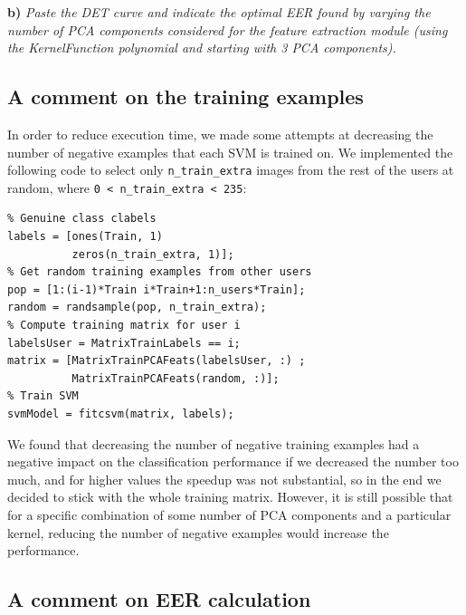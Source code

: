 \documentclass[11pt]{article}
\begin{document}
\textbf{b)} \textit{Paste the DET curve and indicate the optimal EER found by varying the number of PCA components considered for the feature extraction module (using the KernelFunction polynomial and starting with 3 PCA components).}


\subsection*{A comment on the training examples}

In order to reduce execution time, we made some attempts at decreasing the number of negative examples that each SVM is trained on. We implemented the following code to select only \verb|n_train_extra| images from the rest of the users at random, where \verb|0 < n_train_extra < 235|:
\begin{verbatim}
% Genuine class clabels
labels = [ones(Train, 1)
          zeros(n_train_extra, 1)];
% Get random training examples from other users
pop = [1:(i-1)*Train i*Train+1:n_users*Train];
random = randsample(pop, n_train_extra);
% Compute training matrix for user i
labelsUser = MatrixTrainLabels == i;
matrix = [MatrixTrainPCAFeats(labelsUser, :) ;
          MatrixTrainPCAFeats(random, :)];
% Train SVM
svmModel = fitcsvm(matrix, labels);
\end{verbatim}

We found that decreasing the number of negative training examples had a negative impact on the classification performance if we decreased the number too much, and for higher values the speedup was not substantial, so in the end we decided to stick with the whole training matrix. However, it is still possible that for a specific combination of some number of PCA components and a particular kernel, reducing the number of negative examples would increase the performance.

\subsection*{A comment on EER calculation}



\end{document}
